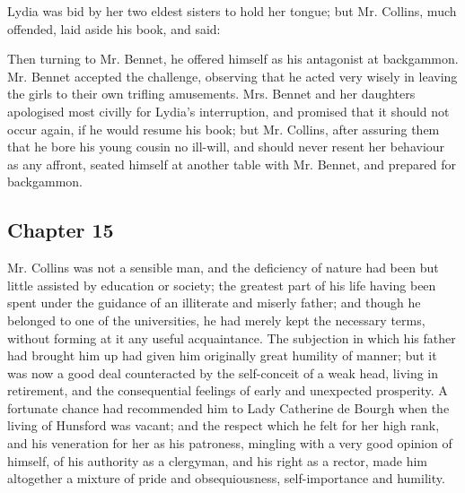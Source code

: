 
Lydia was bid by her two eldest sisters to hold her tongue; but Mr. Collins, much offended, laid aside his book, and said:


Then turning to Mr. Bennet, he offered himself as his antagonist at backgammon. Mr. Bennet accepted the challenge, observing that he acted very wisely in leaving the girls to their own trifling amusements. Mrs. Bennet and her daughters apologised most civilly for Lydia's interruption, and promised that it should not occur again, if he would resume his book; but Mr. Collins, after assuring them that he bore his young cousin no ill-will, and should never resent her behaviour as any affront, seated himself at another table with Mr. Bennet, and prepared for backgammon.

\subsection[chapter-15]{\useURL[url15][][][]\from[url15] Chapter 15}

Mr. Collins was not a sensible man, and the deficiency of nature had been but little assisted by education or society; the greatest part of his life having been spent under the guidance of an illiterate and miserly father; and though he belonged to one of the universities, he had merely kept the necessary terms, without forming at it any useful acquaintance. The subjection in which his father had brought him up had given him originally great humility of manner; but it was now a good deal counteracted by the self-conceit of a weak head, living in retirement, and the consequential feelings of early and unexpected prosperity. A fortunate chance had recommended him to Lady Catherine de Bourgh when the living of Hunsford was vacant; and the respect which he felt for her high rank, and his veneration for her as his patroness, mingling with a very good opinion of himself, of his authority as a clergyman, and his right as a rector, made him altogether a mixture of pride and obsequiousness, self-importance and humility.

